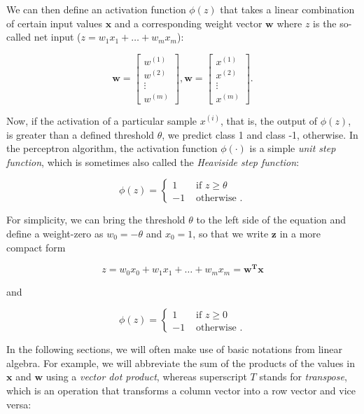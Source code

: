 \documentclass[letterpaper]{report}
\begin{document}
We can then define an activation function $\phi(z)$ that takes a linear combination of certain
input values $\mathbf{x}$ and a corresponding weight vector $\mathbf{w}$ where $z$ is the so-called net
input ($z = w_1 x_1 + \dots + w_m x_m$):

\[
\mathbf{w} = \begin{bmatrix}
    w^{(1)}  \\
    w^{(2)}  \\
    \vdots  \\
    w^{(m)}
\end{bmatrix},
\mathbf{w} = \begin{bmatrix}
    x^{(1)}  \\
    x^{(2)}  \\
    \vdots  \\
    x^{(m)}
\end{bmatrix}.
\]

Now, if the activation of a particular sample $x^{(i)}$, that is, the output of $\phi(z)$, is greater than a defined threshold $\theta$, we predict class 1 and class -1, otherwise. In the perceptron algorithm, the activation function $\phi(\cdot)$ is a simple \textit{unit step function}, which is sometimes also called the \textit{Heaviside step function}:

\[ \phi(z) = \begin{cases} 
      1 & \text{ if } z \ge \theta \\
      -1 & \text{ otherwise }.
   \end{cases}
\]

For simplicity, we can bring the threshold $\theta$ to the left side of the equation and define a weight-zero as $w_0 = -\theta$ and $x_0=1$, so that we write $\mathbf{z}$ in a more compact form

\[
z  = w_0 x_0 + w_1 x_1 + \dots + w_m x_m = \mathbf{w^T x}
\]

and

\[ \phi(z) = \begin{cases} 
      1 & \text{ if } z \ge 0 \\
      -1 & \text{ otherwise }.
   \end{cases}
\]


In the following sections, we will often make use of basic notations from linear algebra. For example, we will abbreviate the sum of the products of the values in $\mathbf{x}$ and $\mathbf{w}$ using a \textit{vector dot product}, whereas superscript $T$ stands for \textit{transpose}, which is an operation that transforms a column vector into a row vector and vice versa:
\end{document}
